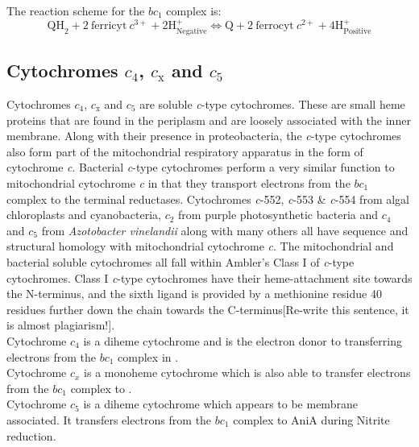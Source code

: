 The reaction scheme for the $bc_1$ complex is:
\begin{equation}
\mathrm{QH}_2 + 2 \mathrm{~ferricyt~} c^{3+} + 2\mathrm{H}^+_{\mathrm{Negative}} \Longleftrightarrow \mathrm{Q} + 2 \mathrm{~ferrocyt~} c^{2+} + 4\mathrm{H}^+_{\mathrm{Positive}}
\end{equation}

\subsection{Cytochromes $c_\mathrm{4}$, $c_\mathrm{x}$ and $c_\mathrm{5}$}
Cytochromes $c_\mathrm{4}$, $c_\mathrm{x}$ and $c_\mathrm{5}$ are soluble \textit{c}-type cytochromes. These are small heme proteins that are found in the periplasm and are loosely associated with the inner membrane. Along with their presence in proteobacteria, the \textit{c}-type cytochromes also form part of the mitochondrial respiratory apparatus in the form of cytochrome \textit{c}. Bacterial \textit{c}-type cytochromes perform a very similar function to mitochondrial cytochrome \textit{c} in that they transport electrons from the $bc_1$ complex to the terminal reductases. Cytochromes \textit{c}-552, \textit{c}-553 \& \textit{c}-554 from algal chloroplasts and cyanobacteria, $c_2$ from purple photosynthetic bacteria and $c_4$ and $c_5$ from \textit{Azotobacter vinelandii} along with many others all have sequence and structural homology with mitochondrial cytochrome \textit{c}\cite{Wood1983}. The mitochondrial and bacterial soluble cytochromes all fall within Ambler's Class I of \textit{c}-type cytochromes\cite{Ambler1991}.
Class I \textit{c}-type cytochromes have their heme-attachment site towards the N-terminus, and the sixth ligand is provided by a methionine residue 40 residues further down the chain towards the C-terminus\cite{Ambler1991}[Re-write this sentence, it is almost plagiarism!].\\
Cytochrome $c_4$ is a diheme cytochrome and is the electron donor to \cbbthree{} transferring electrons from the $bc_1$ complex in \Nm{}\cite{Deeudom2007,Deeudom2008,Chang2010}.\\
Cytochrome $c_x$ is a monoheme cytochrome which is also able to transfer electrons from the $bc_1$ complex to \cbbthree{}\cite{Deeudom2007,Deeudom2008}.\\
Cytochrome $c_5$ is a diheme cytochrome which appears to be membrane associated. It transfers electrons from the $bc_1$ complex to AniA during Nitrite reduction\cite{Deeudom2007,Deeudom2008}.


